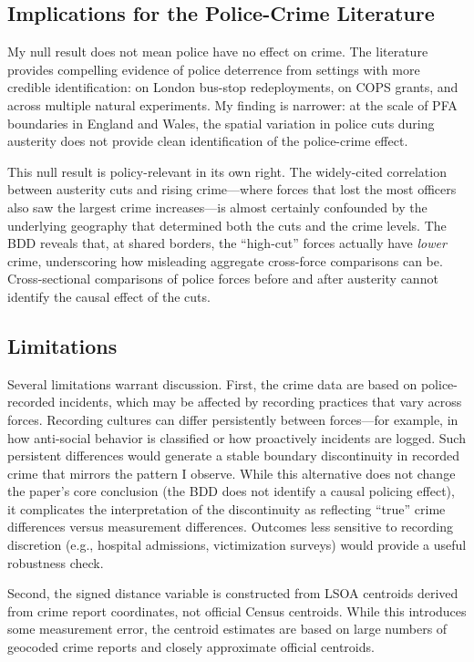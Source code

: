 \documentclass[12pt]{article}
\begin{document}
\subsection{Implications for the Police-Crime Literature}

My null result does not mean police have no effect on crime. The literature provides compelling evidence of police deterrence from settings with more credible identification: \citet{draca2011} on London bus-stop redeployments, \citet{mello2019} on COPS grants, and \citet{chalfin2018} across multiple natural experiments. My finding is narrower: at the scale of PFA boundaries in England and Wales, the spatial variation in police cuts during austerity does not provide clean identification of the police-crime effect.

This null result is policy-relevant in its own right. The widely-cited correlation between austerity cuts and rising crime---where forces that lost the most officers also saw the largest crime increases---is almost certainly confounded by the underlying geography that determined both the cuts and the crime levels. The BDD reveals that, at shared borders, the ``high-cut'' forces actually have \textit{lower} crime, underscoring how misleading aggregate cross-force comparisons can be. Cross-sectional comparisons of police forces before and after austerity cannot identify the causal effect of the cuts.

\subsection{Limitations}

Several limitations warrant discussion. First, the crime data are based on police-recorded incidents, which may be affected by recording practices that vary across forces. Recording cultures can differ persistently between forces---for example, in how anti-social behavior is classified or how proactively incidents are logged. Such persistent differences would generate a stable boundary discontinuity in recorded crime that mirrors the pattern I observe. While this alternative does not change the paper's core conclusion (the BDD does not identify a causal policing effect), it complicates the interpretation of the discontinuity as reflecting ``true'' crime differences versus measurement differences. Outcomes less sensitive to recording discretion (e.g., hospital admissions, victimization surveys) would provide a useful robustness check.

Second, the signed distance variable is constructed from LSOA centroids derived from crime report coordinates, not official Census centroids. While this introduces some measurement error, the centroid estimates are based on large numbers of geocoded crime reports and closely approximate official centroids.
\end{document}
